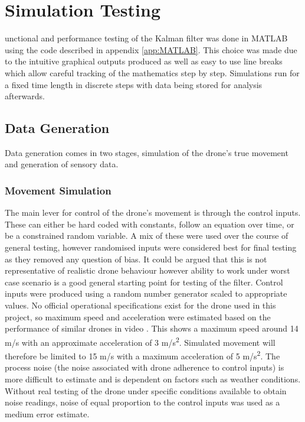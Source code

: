 \let\textcircled=\pgftextcircled
\chapter{Simulation Testing}
\label{chap:simulationtesting}

unctional and performance testing of the Kalman filter was done in MATLAB using the code described in appendix \ref{app:MATLAB}. This choice was made due to the intuitive graphical outputs produced as well as easy to use line breaks which allow careful tracking of the mathematics step by step. Simulations run for a fixed time length in discrete steps with data being stored for analysis afterwards.

\section{Data Generation}
Data generation comes in two stages, simulation of the drone's true movement and generation of sensory data.

\subsection{Movement Simulation}
The main lever for control of the drone's movement is through the control inputs. These can either be hard coded with constants, follow an equation over time, or be a constrained random variable. A mix of these were used over the course of general testing, however randomised inputs were considered best for final testing as they removed any question of bias. It could be argued that this is not representative of realistic drone behaviour however ability to work under worst case scenario is a good general starting point for testing of the filter. Control inputs were produced using a random number generator scaled to appropriate values. No official operational specifications exist for the drone used in this project, so maximum speed and acceleration were estimated based on the performance of similar drones in video \cite{hummingbird2015speed}. This shows a maximum speed around 14 m/s with an approximate acceleration of 3 m/s\textsuperscript{2}. Simulated movement will therefore be limited to 15 m/s with a maximum acceleration of 5 m/s\textsuperscript{2}. The process noise (the noise associated with drone adherence to control inputs) is more difficult to estimate and is dependent on factors such as weather conditions. Without real testing of the drone under specific conditions available to obtain noise readings, noise of equal proportion to the control inputs was used as a medium error estimate. \par

